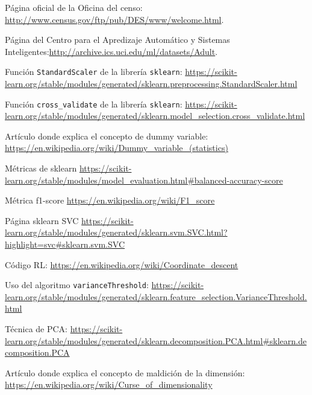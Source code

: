 \documentclass[11pt,a4paper]{article}
\begin{document}
\newpage
\begin{thebibliography}{9}
Página oficial de la Oficina del censo: \url{http://www.census.gov/ftp/pub/DES/www/welcome.html}.

Página del Centro para el Apredizaje Automático y Sistemas Inteligentes:\url{http://archive.ics.uci.edu/ml/datasets/Adult}.

Función \texttt{StandardScaler} de la librería \texttt{sklearn}: \url{https://scikit-learn.org/stable/modules/generated/sklearn.preprocessing.StandardScaler.html}

Función \texttt{cross\_validate} de la librería \texttt{sklearn}:
\url{https://scikit-learn.org/stable/modules/generated/sklearn.model_selection.cross_validate.html}

Artículo donde explica el concepto de dummy variable: \url{https://en.wikipedia.org/wiki/Dummy_variable_(statistics)}

Métricas de sklearn \url{https://scikit-learn.org/stable/modules/model_evaluation.html#balanced-accuracy-score}


Métrica f1-score \url{https://en.wikipedia.org/wiki/F1_score}


Página sklearn SVC \url{https://scikit-learn.org/stable/modules/generated/sklearn.svm.SVC.html?highlight=svc#sklearn.svm.SVC}

Código RL: \url{https://en.wikipedia.org/wiki/Coordinate_descent}


Uso del algoritmo \texttt{varianceThreshold}: \url{https://scikit-learn.org/stable/modules/generated/sklearn.feature_selection.VarianceThreshold.html}

Técnica de PCA: 
\url{https://scikit-learn.org/stable/modules/generated/sklearn.decomposition.PCA.html#sklearn.decomposition.PCA}

Artículo donde explica el concepto de maldición de la dimensión: \url{https://en.wikipedia.org/wiki/Curse_of_dimensionality}


\end{thebibliography}
\end{document}
